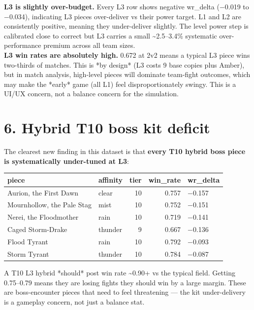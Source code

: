 \documentclass[10pt]{article}
\begin{document}
\textbf{L3 is slightly over-budget.} Every L3 row shows negative wr\_delta (−0.019 to −0.034), indicating L3 pieces over-deliver vs their power target. L1 and L2 are consistently positive, meaning they under-deliver slightly. The level power step is calibrated close to correct but L3 carries a small \textasciitilde{}2.5--3.4\% systematic over-performance premium across all team sizes.\\

\textbf{L3 win rates are absolutely high.} 0.672 at 2v2 means a typical L3 piece wins two-thirds of matches. This is *by design* (L3 costs 9 base copies plus Amber), but in match analysis, high-level pieces will dominate team-fight outcomes, which may make the *early* game (all L1) feel disproportionately swingy. This is a UI/UX concern, not a balance concern for the simulation.\\


\section*{6. Hybrid T10 boss kit deficit}

The clearest new finding in this dataset is that \textbf{every T10 hybrid boss piece is systematically under-tuned at L3}:\\

\medskip
\begin{tabularx}{\linewidth}{LLrrL}
\toprule
\textbf{piece} & \textbf{affinity} & \textbf{tier} & \textbf{win\_rate} & \textbf{wr\_delta} \\
\midrule
Aurion, the First Dawn & clear & 10 & 0.757 & −0.157 \\
Mournhollow, the Pale Stag & mist & 10 & 0.752 & −0.151 \\
Nerei, the Floodmother & rain & 10 & 0.719 & −0.141 \\
Caged Storm-Drake & thunder & 9 & 0.667 & −0.136 \\
Flood Tyrant & rain & 10 & 0.792 & −0.093 \\
Storm Tyrant & thunder & 10 & 0.784 & −0.087 \\
\bottomrule
\end{tabularx}
\medskip

A T10 L3 hybrid *should* post win rate \textasciitilde{}0.90+ vs the typical field. Getting 0.75--0.79 means they are losing fights they should win by a large margin. These are boss-encounter pieces that need to feel threatening --- the kit under-delivery is a gameplay concern, not just a balance stat.\\
\end{document}
